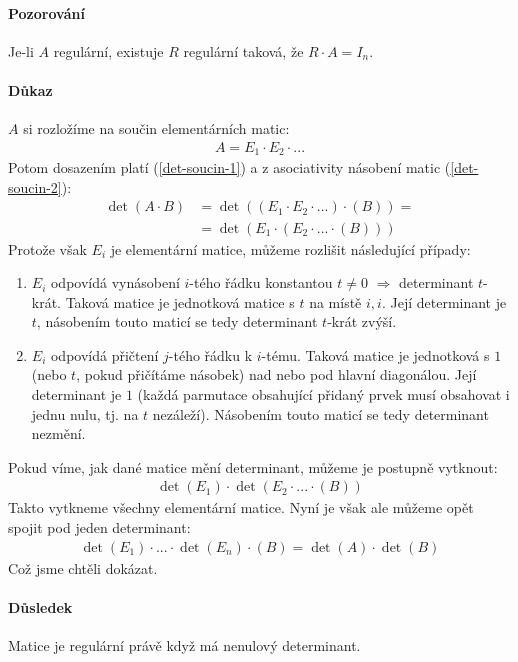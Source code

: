 \documentclass[a4paper,10pt]{article}
\begin{document}
\paragraph{Pozorování}
Je-li $A$ regulární, existuje $R$ regulární taková, že $R \cdot A = I_n$.

\paragraph{Důkaz}
$A$ si rozložíme na součin elementárních matic:
\begin{align}
	A = E_1 \cdot E_2 \cdot ...
\end{align}
Potom dosazením platí (\ref{det-soucin-1}) a z asociativity násobení matic
(\ref{det-soucin-2}):
\begin{align}
	\det (A \cdot B) &= \det ( (E_1 \cdot E_2 \cdot ...) \cdot (B)) = 
											\label{det-soucin-1}\\
					 &= \det ( E_1 \cdot (E_2 \cdot ... \cdot (B)))
					 						\label{det-soucin-2}
\end{align}
Protože však $E_i$ je elementární matice, můžeme rozlišit následující případy:
\begin{enumerate}
	\item $E_i$ odpovídá vynásobení $i$-tého řádku konstantou $t \neq 0$ 
	$\Rightarrow$ determinant $t$-krát. Taková matice je jednotková matice s $t$
	na místě $i,i$. Její determinant je $t$, násobením touto maticí se tedy
	determinant $t$-krát zvýší.
	\item $E_i$ odpovídá přičtení $j$-tého řádku k $i$-tému. Taková matice je
	jednotková s $1$ (nebo $t$, pokud přičítáme násobek) nad nebo pod hlavní
	diagonálou. Její determinant je $1$ (každá parmutace obsahující přidaný
	prvek musí obsahovat i jednu nulu, tj. na $t$ nezáleží). Násobením touto
	maticí se tedy determinant nezmění.
\end{enumerate}
Pokud víme, jak dané matice mění determinant, můžeme je postupně vytknout:
\begin{align}
		\det (E_1) \cdot \det ( E_2 \cdot ... \cdot (B)) 
\end{align}
Takto vytkneme všechny elementární matice. Nyní je však ale můžeme opět spojit
pod jeden determinant:
\begin{align}
		\det (E_1) \cdot ... \cdot \det (E_n) \cdot (B) = 
		\det (A) \cdot \det(B)
\end{align}
Což jsme chtěli dokázat.

\paragraph{Důsledek}
Matice je regulární právě když má nenulový determinant.
\end{document}
